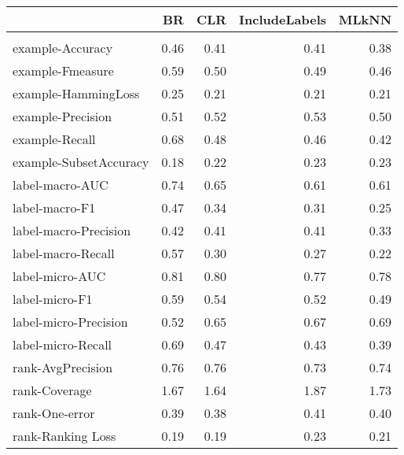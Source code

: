 \begin{tabular}{l|rrrr}

  & BR & CLR & IncludeLabels & MLkNN \\

\hline \\

example-Accuracy & 0.46 & 0.41 & 0.41 & 0.38 \\

example-Fmeasure & 0.59 & 0.50 & 0.49 & 0.46 \\

example-HammingLoss & 0.25 & 0.21 & 0.21 & 0.21 \\

example-Precision & 0.51 & 0.52 & 0.53 & 0.50 \\

example-Recall & 0.68 & 0.48 & 0.46 & 0.42 \\

example-SubsetAccuracy & 0.18 & 0.22 & 0.23 & 0.23 \\

label-macro-AUC & 0.74 & 0.65 & 0.61 & 0.61 \\

label-macro-F1 & 0.47 & 0.34 & 0.31 & 0.25 \\

label-macro-Precision & 0.42 & 0.41 & 0.41 & 0.33 \\

label-macro-Recall & 0.57 & 0.30 & 0.27 & 0.22 \\

label-micro-AUC & 0.81 & 0.80 & 0.77 & 0.78 \\

label-micro-F1 & 0.59 & 0.54 & 0.52 & 0.49 \\

label-micro-Precision & 0.52 & 0.65 & 0.67 & 0.69 \\

label-micro-Recall & 0.69 & 0.47 & 0.43 & 0.39 \\

rank-AvgPrecision & 0.76 & 0.76 & 0.73 & 0.74 \\

rank-Coverage & 1.67 & 1.64 & 1.87 & 1.73 \\

rank-One-error & 0.39 & 0.38 & 0.41 & 0.40 \\

rank-Ranking Loss & 0.19 & 0.19 & 0.23 & 0.21 \\

\end{tabular}
